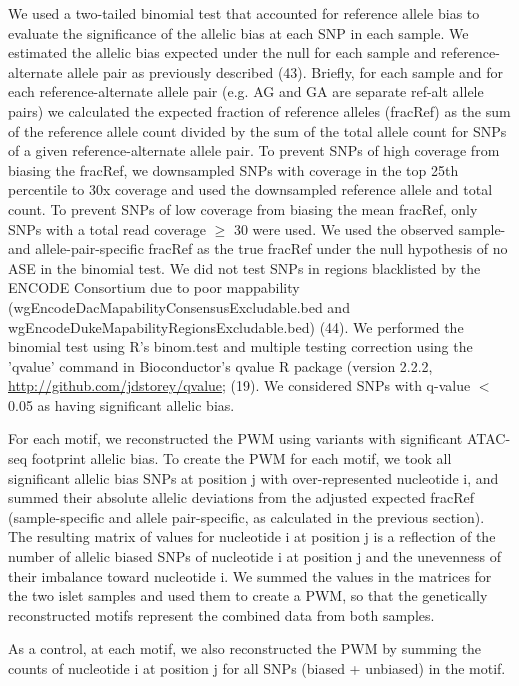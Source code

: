 We used a two-tailed binomial test that accounted for reference allele bias to evaluate the significance of the allelic bias at each SNP in each sample.  We estimated the allelic bias expected under the null for each sample and reference-alternate allele pair as previously described (43). Briefly, for each sample and for each reference-alternate allele pair (e.g. AG and GA are separate ref-alt allele pairs) we calculated the expected fraction of reference alleles (fracRef) as the sum of the reference allele count divided by the sum of the total allele count for SNPs of a given reference-alternate allele pair. To prevent SNPs of high coverage from biasing the fracRef, we downsampled SNPs with coverage in the top 25th percentile to 30x coverage and used the downsampled reference allele and total count. To prevent SNPs of low coverage from biasing the mean fracRef, only SNPs with a total read coverage $\geq$ 30 were used. We used the observed sample- and allele-pair-specific fracRef as the true fracRef under the null hypothesis of no ASE in the binomial test. We did not test SNPs in regions blacklisted by the ENCODE Consortium due to poor mappability (wgEncodeDacMapabilityConsensusExcludable.bed and wgEncodeDukeMapabilityRegionsExcludable.bed) (44). We performed the binomial test using R’s binom.test and multiple testing correction using the 'qvalue' command in Bioconductor’s qvalue R package (version 2.2.2, \url{http://github.com/jdstorey/qvalue}; (19). We considered SNPs with q-value $<$ 0.05 as having significant allelic bias.

For each motif, we reconstructed the PWM using variants with significant ATAC-seq footprint allelic bias. To create the PWM for each motif, we took all significant allelic bias SNPs at position j with over-represented nucleotide i, and summed their absolute allelic deviations from the adjusted expected fracRef (sample-specific and allele pair-specific, as calculated in the previous section). The resulting matrix of values for nucleotide i at position j is a reflection of the number of allelic biased SNPs of nucleotide i at position j and the unevenness of their imbalance toward nucleotide i. We summed the values in the matrices for the two islet samples and used them to create a PWM, so that the genetically reconstructed motifs represent the combined data from both samples. 

As a control, at each motif, we also reconstructed the PWM by summing the counts of nucleotide i at position j for all SNPs (biased + unbiased) in the motif.

